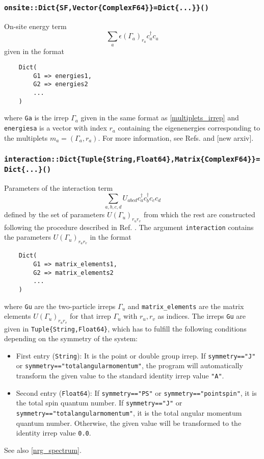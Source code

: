\documentclass[notitlepage]{article}
\begin{document}
\subsubsection{\texttt{onsite::Dict\{SF,Vector\{ComplexF64\}\}=Dict\{...\}\}()}}
\label{nrg_onsite}
On-site energy term 
\begin{equation}
    \sum_a
    \epsilon(\Gamma_a)_{r_a}
    c^\dagger_a c_a
\end{equation}
given in the format
\begin{verbatim}
    Dict(
        G1 => energies1,
        G2 => energies2
        ...
    )
\end{verbatim}
where \texttt{Ga} is the irrep $\Gamma_a$ given in the same
format as \ref{multiplets_irrep} and \texttt{energiesa} is a
vector with index $r_a$ containing the eigenenergies
corresponding to the multiplets $m_a=(\Gamma_a,r_a)$. For
more information, see Refs. \cite{calvo-fernandez2024} and
[new arxiv].

\subsubsection{\texttt{interaction::Dict\{Tuple\{String,Float64\},Matrix\{ComplexF64\}\}=Dict\{...\}()}}
\label{nrg_interaction}
Parameters of the interaction term
\begin{equation}
    \sum_{a,b,c,d} U_{abcd} 
    c^\dagger_a c^\dagger_b
    c_c c_d
\end{equation}
defined by the set of parameters $U(\Gamma_u)_{r_u r_v}$
from which the rest are constructed following the procedure
described in Ref. \cite{calvo-fernandez2024}. The argument
\texttt{interaction} contains the parameters $U(\Gamma_u)_{r_u r_v}$
in the format
\begin{verbatim}
    Dict(
        G1 => matrix_elements1,
        G2 => matrix_elements2
        ...
    )
\end{verbatim}
where \texttt{Gu} are the two-particle irreps $\Gamma_u$ and
\texttt{matrix\_elements} are the matrix elements
$U(\Gamma_u)_{r_u r_v}$ for that irrep $\Gamma_u$ with
$r_u,r_v$ as indices. The irreps \texttt{Gu} are given in 
\texttt{Tuple\{String,Float64\}}, which has to fulfill the
following conditions depending on the symmetry of the
system:
\begin{itemize}
    \item First entry (\texttt{String}): It is the point or
    double group irrep. If \texttt{symmetry=="J"} or
    \texttt{symmetry=="totalangularmomentum"}, the program
    will automatically transform the given value to the
    standard identity irrep value \texttt{"A"}.
    \item Second entry (\texttt{Float64}): If
    \texttt{symmetry=="PS"} or
    \texttt{symmetry=="pointspin"}, it is the total spin
    quantum number. If \texttt{symmetry=="J"} or
    \texttt{symmetry=="totalangularmomentum"}, it is the
    total angular momentum quantum number. Otherwise, the
    given value will be transformed to the identity irrep value 
    \texttt{0.0}.
\end{itemize}
See also \ref{nrg_spectrum}.
\end{document}
